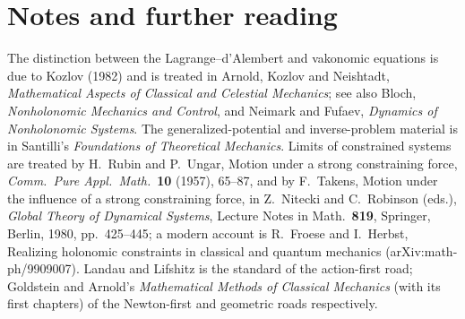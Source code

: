 \section*{Notes and further reading}

The distinction between the Lagrange--d'Alembert and vakonomic equations is
due to Kozlov (1982) and is treated in Arnold, Kozlov and Neishtadt,
\emph{Mathematical Aspects of Classical and Celestial Mechanics}; see also
Bloch, \emph{Nonholonomic Mechanics and Control}, and Neimark and Fufaev,
\emph{Dynamics of Nonholonomic Systems}. The generalized-potential and
inverse-problem material is in Santilli's \emph{Foundations of Theoretical
Mechanics}. Limits of constrained systems are treated by H.~Rubin and P.~Ungar, Motion
under a strong constraining force, \emph{Comm.\ Pure Appl.\ Math.}\ \textbf{10}
(1957), 65--87, and by F.~Takens, Motion under the influence of a strong
constraining force, in Z.~Nitecki and C.~Robinson (eds.), \emph{Global Theory of
Dynamical Systems}, Lecture Notes in Math.\ \textbf{819}, Springer, Berlin, 1980,
pp.~425--445; a modern account is R.~Froese and I.~Herbst, Realizing holonomic
constraints in classical and quantum mechanics (arXiv:math-ph/9909007). Landau and
Lifshitz is the standard of the action-first road; Goldstein and Arnold's
\emph{Mathematical Methods of Classical Mechanics} (with its first chapters) of the
Newton-first and geometric roads respectively.
